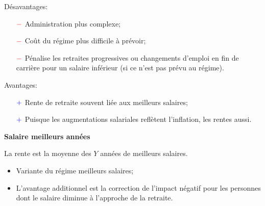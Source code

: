 \documentclass[10pt, french]{article}
\begin{document}
\begin{multicols*}{3}
\begin{definitionNOHFILL}
Désavantages:
\begin{itemize}
	\item[$\color{red}-$]	Administration plus complexe;
	\item[$\color{red}-$]	Coût du régime plus difficile à prévoir;
	\item[$\color{red}-$]	Pénalise les retraites progressives ou changements d'emploi en fin de carrière pour un salaire inférieur (si ce n'est pas prévu au régime).
\end{itemize}

Avantages:
\begin{itemize}
	\item[$\color{blue}+$]	Rente de retraite souvent liée aux meilleurs salaires;
	\item[$\color{blue}+$]	Puisque les augmentations salariales reflètent l'inflation, les rentes aussi.
\end{itemize}

\tcbline

\begin{center}
	\textbf{Salaire meilleurs années}
\end{center}
La rente est la moyenne des $Y$ années de meilleurs salaires. 

\begin{itemize}
	\item	Variante du régime meilleurs salaires;
	\item	L'avantage additionnel est la correction de l'impact négatif pour les personnes dont le salaire diminue à l'approche de la retraite.
\end{itemize}
\end{definitionNOHFILL}


\end{multicols*}
\end{document}
